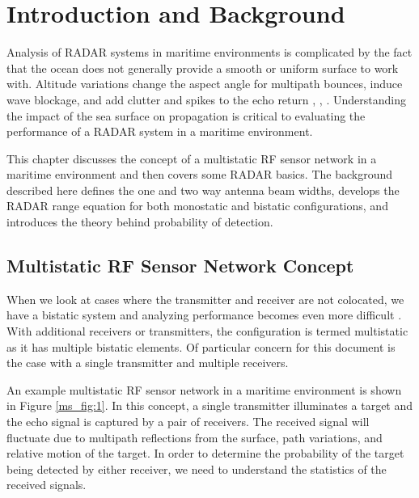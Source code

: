 \renewcommand{\baselinestretch}{2} \small\normalsize
\chapter{Introduction and Background}
Analysis of RADAR systems in maritime environments is complicated by the fact that the ocean does not generally provide a smooth or uniform surface to work with. Altitude variations change the aspect angle for multipath bounces, induce wave blockage, and add clutter and spikes to the echo return \cite{skolnik_handbook}, \cite{blake_radar}, \cite{nathanson_radar}. Understanding the impact of the sea surface on propagation is critical to evaluating the performance of a RADAR system in a maritime environment.

This chapter discusses the concept of a multistatic RF sensor network in a maritime environment and then covers some RADAR basics. The background described here defines the one and two way antenna beam widths, develops the RADAR range equation for both monostatic and bistatic configurations, and introduces the theory behind probability of detection.

\section{Multistatic RF Sensor Network Concept}
When we look at cases where the transmitter and receiver are not colocated, we have a bistatic system and analyzing performance becomes even more difficult \cite{willis_bistatic}. With additional receivers or transmitters, the configuration is termed multistatic as it has multiple bistatic elements. Of particular concern for this document is the case with a single transmitter and multiple receivers.

An example multistatic RF sensor network in a maritime environment is shown in Figure \ref{ms_fig:1}. In this concept, a single transmitter illuminates a target and the echo signal is captured by a pair of receivers. The received signal will fluctuate due to multipath reflections from the surface, path variations, and relative motion of the target. In order to determine the probability of the target being detected by either receiver, we need to understand the statistics of the received signals.

